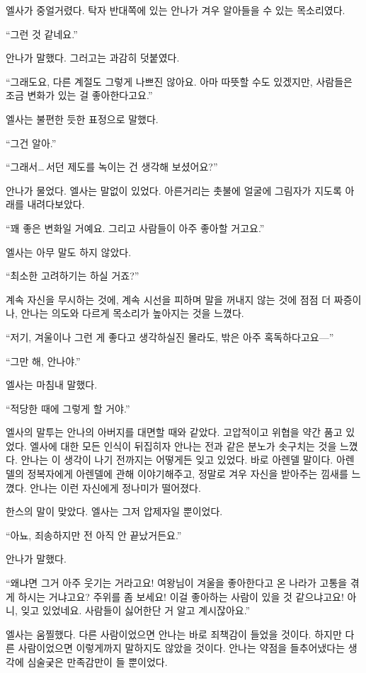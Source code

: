 엘사가 중얼거렸다. 탁자 반대쪽에 있는 안나가 겨우 알아들을 수 있는 목소리였다.

``그런 것 같네요.''

안나가 말했다. 그러고는 과감히 덧붙였다.

``그래도요, 다른 계절도 그렇게 나쁘진 않아요. 아마 따뜻할 수도 있겠지만, 사람들은 조금 변화가 있는 걸 좋아한다고요.''

엘사는 불편한 듯한 표정으로 말했다.

``그건 알아.''

``그래서\ldots\,서던 제도를 녹이는 건 생각해 보셨어요?''

안나가 물었다. 엘사는 말없이 있었다. 아른거리는 촛불에 얼굴에 그림자가 지도록 아래를 내려다보았다.

``꽤 좋은 변화일 거예요. 그리고 사람들이 아주 좋아할 거고요.''

엘사는 아무 말도 하지 않았다.

``최소한 고려하기는 하실 거죠?''

계속 자신을 무시하는 것에, 계속 시선을 피하며 말을 꺼내지 않는 것에 점점 더 짜증이 나, 안나는 의도와 다르게 목소리가 높아지는 것을 느꼈다.

``저기, 겨울이나 그런 게 좋다고 생각하실진 몰라도, 밖은 아주 혹독하다고요—''

``그만 해, 안나야.''

엘사는 마침내 말했다.

``적당한 때에 그렇게 할 거야.''

엘사의 말투는 안나의 아버지를 대면할 때와 같았다. 고압적이고 위협을 약간 품고 있었다. 엘사에 대한 모든 인식이 뒤집히자 안나는 전과 같은 분노가 솟구치는 것을 느꼈다. 안나는 이 생각이 나기 전까지는 어떻게든 잊고 있었다. 바로 아렌델 말이다. 아렌델의 정복자에게 아렌델에 관해 이야기해주고, 정말로 겨우 자신을 받아주는 낌새를 느꼈다. 안나는 이런 자신에게 정나미가 떨어졌다.

한스의 말이 맞았다. 엘사는 그저 압제자일 뿐이었다.

``아뇨, 죄송하지만 전 아직 안 끝났거든요.''

안나가 말했다.

``왜냐면 그거 아주 웃기는 거라고요! 여왕님이 겨울을 좋아한다고 온 나라가 고통을 겪게 하시는 거냐고요? 주위를 좀 보세요! 이걸 좋아하는 사람이 있을 것 같으냐고요! 아니, 잊고 있었네요. 사람들이 싫어한단 거 알고 계시잖아요.''

엘사는 움찔했다. 다른 사람이었으면 안나는 바로 죄책감이 들었을 것이다. 하지만 다른 사람이었으면 이렇게까지 말하지도 않았을 것이다. 안나는 약점을 들추어냈다는 생각에 심술궂은 만족감만이 들 뿐이었다.

